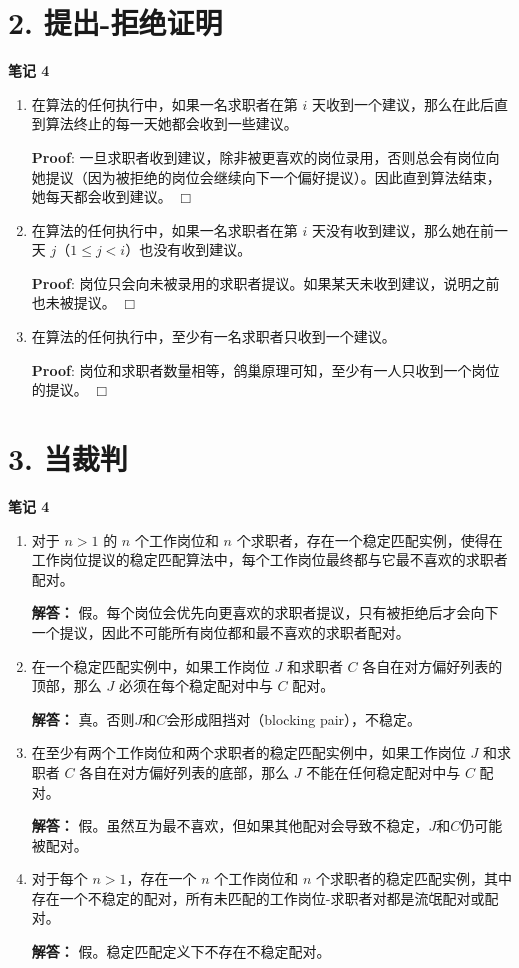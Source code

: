 \documentclass[11pt]{article}
\newenvironment{qparts}{\begin{enumerate}[{(}a{)}]}{\end{enumerate}}
\def\endproofmark{$\Box$}
\newenvironment{proof}{\par{\bf Proof}:}{\endproofmark\smallskip}
\begin{document}
\section*{2. 提出-拒绝证明}
\textbf{笔记 4}
\begin{qparts}
\item 在算法的任何执行中，如果一名求职者在第 $i$ 天收到一个建议，那么在此后直到算法终止的每一天她都会收到一些建议。

\begin{proof}
一旦求职者收到建议，除非被更喜欢的岗位录用，否则总会有岗位向她提议（因为被拒绝的岗位会继续向下一个偏好提议）。因此直到算法结束，她每天都会收到建议。
\end{proof}

\item 在算法的任何执行中，如果一名求职者在第 $i$ 天没有收到建议，那么她在前一天 $j$（$1 \leq j < i$）也没有收到建议。

\begin{proof}
岗位只会向未被录用的求职者提议。如果某天未收到建议，说明之前也未被提议。
\end{proof}

\item 在算法的任何执行中，至少有一名求职者只收到一个建议。

\begin{proof}
岗位和求职者数量相等，鸽巢原理可知，至少有一人只收到一个岗位的提议。
\end{proof}
\end{qparts}

\section*{3. 当裁判}
\textbf{笔记 4}
\begin{qparts}
\item 对于 $n > 1$ 的 $n$ 个工作岗位和 $n$ 个求职者，存在一个稳定匹配实例，使得在工作岗位提议的稳定匹配算法中，每个工作岗位最终都与它最不喜欢的求职者配对。

\textbf{解答：} 假。每个岗位会优先向更喜欢的求职者提议，只有被拒绝后才会向下一个提议，因此不可能所有岗位都和最不喜欢的求职者配对。

\item 在一个稳定匹配实例中，如果工作岗位 $J$ 和求职者 $C$ 各自在对方偏好列表的顶部，那么 $J$ 必须在每个稳定配对中与 $C$ 配对。

\textbf{解答：} 真。否则$J$和$C$会形成阻挡对（blocking pair），不稳定。

\item 在至少有两个工作岗位和两个求职者的稳定匹配实例中，如果工作岗位 $J$ 和求职者 $C$ 各自在对方偏好列表的底部，那么 $J$ 不能在任何稳定配对中与 $C$ 配对。

\textbf{解答：} 假。虽然互为最不喜欢，但如果其他配对会导致不稳定，$J$和$C$仍可能被配对。

\item 对于每个 $n > 1$，存在一个 $n$ 个工作岗位和 $n$ 个求职者的稳定匹配实例，其中存在一个不稳定的配对，所有未匹配的工作岗位-求职者对都是流氓配对或配对。

\textbf{解答：} 假。稳定匹配定义下不存在不稳定配对。
\end{qparts}
\end{document}
